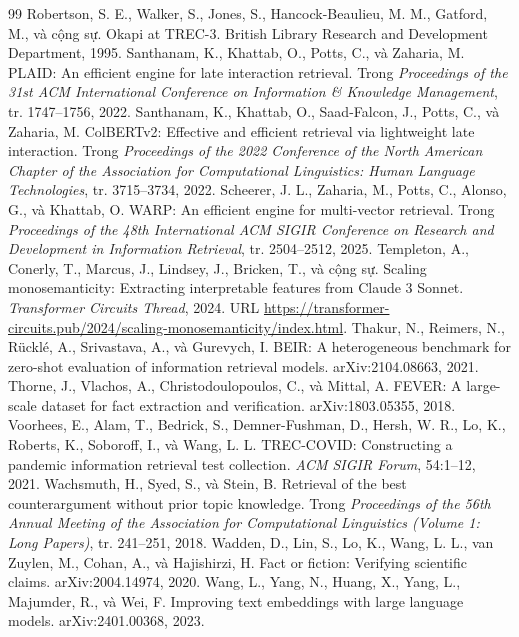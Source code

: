 \documentclass[a4paper,13pt]{extreport}
\theoremstyle{plain}
\begin{document}
\begin{thebibliography}{99}
 Robertson, S. E., Walker, S., Jones, S., Hancock-Beaulieu, M. M., Gatford, M., và cộng sự. Okapi at TREC-3. British Library Research and Development Department, 1995.
 Santhanam, K., Khattab, O., Potts, C., và Zaharia, M. PLAID: An efficient engine for late interaction retrieval. Trong \emph{Proceedings of the 31st ACM International Conference on Information \& Knowledge Management}, tr. 1747--1756, 2022.
 Santhanam, K., Khattab, O., Saad-Falcon, J., Potts, C., và Zaharia, M. ColBERTv2: Effective and efficient retrieval via lightweight late interaction. Trong \emph{Proceedings of the 2022 Conference of the North American Chapter of the Association for Computational Linguistics: Human Language Technologies}, tr. 3715--3734, 2022.
 Scheerer, J. L., Zaharia, M., Potts, C., Alonso, G., và Khattab, O. WARP: An efficient engine for multi-vector retrieval. Trong \emph{Proceedings of the 48th International ACM SIGIR Conference on Research and Development in Information Retrieval}, tr. 2504--2512, 2025.
 Templeton, A., Conerly, T., Marcus, J., Lindsey, J., Bricken, T., và cộng sự. Scaling monosemanticity: Extracting interpretable features from Claude 3 Sonnet. \emph{Transformer Circuits Thread}, 2024. URL \url{https://transformer-circuits.pub/2024/scaling-monosemanticity/index.html}.
 Thakur, N., Reimers, N., Rücklé, A., Srivastava, A., và Gurevych, I. BEIR: A heterogeneous benchmark for zero-shot evaluation of information retrieval models. arXiv:2104.08663, 2021.
 Thorne, J., Vlachos, A., Christodoulopoulos, C., và Mittal, A. FEVER: A large-scale dataset for fact extraction and verification. arXiv:1803.05355, 2018.
 Voorhees, E., Alam, T., Bedrick, S., Demner-Fushman, D., Hersh, W. R., Lo, K., Roberts, K., Soboroff, I., và Wang, L. L. TREC-COVID: Constructing a pandemic information retrieval test collection. \emph{ACM SIGIR Forum}, 54:1--12, 2021.
 Wachsmuth, H., Syed, S., và Stein, B. Retrieval of the best counterargument without prior topic knowledge. Trong \emph{Proceedings of the 56th Annual Meeting of the Association for Computational Linguistics (Volume 1: Long Papers)}, tr. 241--251, 2018.
 Wadden, D., Lin, S., Lo, K., Wang, L. L., van Zuylen, M., Cohan, A., và Hajishirzi, H. Fact or fiction: Verifying scientific claims. arXiv:2004.14974, 2020.
 Wang, L., Yang, N., Huang, X., Yang, L., Majumder, R., và Wei, F. Improving text embeddings with large language models. arXiv:2401.00368, 2023.

\end{thebibliography}
\end{document}
